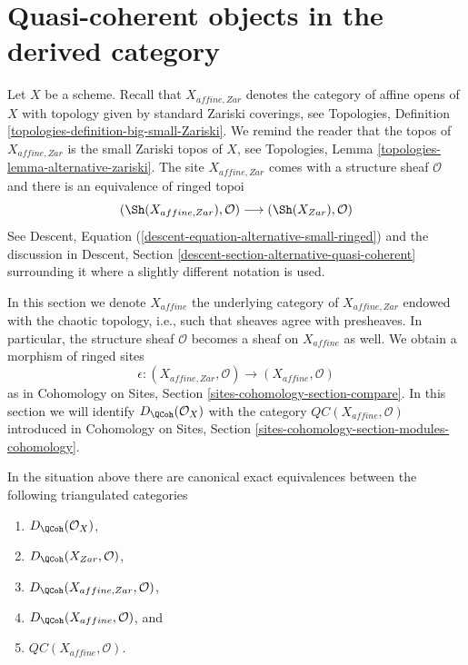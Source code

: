 \section{Quasi-coherent objects in the derived category}
\label{section-QC}

\noindent
Let $X$ be a scheme. Recall that $X_{affine, Zar}$
denotes the category of affine opens of $X$ with topology given
by standard Zariski coverings, see
Topologies, Definition \ref{topologies-definition-big-small-Zariski}.
We remind the reader that the topos of $X_{affine, Zar}$
is the small Zariski topos of $X$, see Topologies, Lemma
\ref{topologies-lemma-alternative-zariski}. The site $X_{affine, Zar}$
comes with a structure sheaf $\mathcal{O}$ and there is an
equivalence of ringed topoi
$$
(\Sh(X_{affine, Zar}), \mathcal{O})
\longrightarrow
(\Sh(X_{Zar}), \mathcal{O})
$$
See Descent, Equation (\ref{descent-equation-alternative-small-ringed})
and the discussion in
Descent, Section \ref{descent-section-alternative-quasi-coherent}
surrounding it where a slightly different notation is used.

\medskip\noindent
In this section we denote $X_{affine}$ the underlying category of
$X_{affine, Zar}$ endowed with the chaotic topology, i.e., such that sheaves
agree with presheaves. In particular, the structure sheaf $\mathcal{O}$
becomes a sheaf on $X_{affine}$ as well.
We obtain a morphism of ringed sites
$$
\epsilon :
(X_{affine, Zar}, \mathcal{O})
\longrightarrow
(X_{affine}, \mathcal{O})
$$
as in Cohomology on Sites, Section \ref{sites-cohomology-section-compare}.
In this section we will identify $D_\QCoh(\mathcal{O}_X)$ with
the category $\mathit{QC}(X_{affine}, \mathcal{O})$ introduced in
Cohomology on Sites, Section \ref{sites-cohomology-section-modules-cohomology}.

\begin{lemma}
\label{lemma-DQCoh-alternative-small}
In the situation above there are canonical exact equivalences between
the following triangulated categories
\begin{enumerate}
\item $D_\QCoh(\mathcal{O}_X)$,
\item $D_\QCoh(X_{Zar}, \mathcal{O})$,
\item $D_\QCoh(X_{affine, Zar}, \mathcal{O})$,
\item $D_\QCoh(X_{affine}, \mathcal{O})$, and
\item $\mathit{QC}(X_{affine}, \mathcal{O})$.
\end{enumerate}
\end{lemma}

